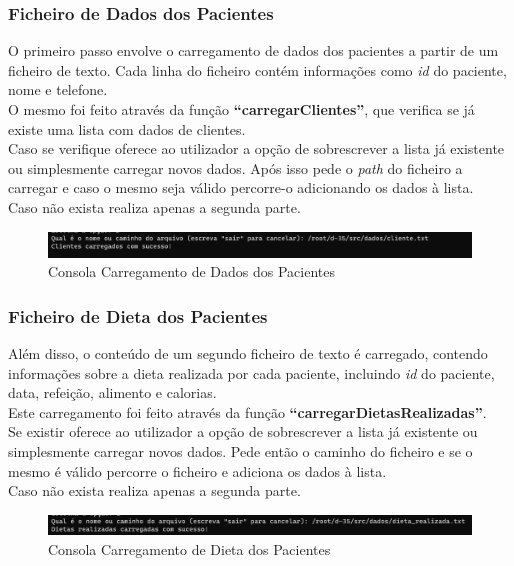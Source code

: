\documentclass{article}
\begin{document}
\newpage

\subsubsection{Ficheiro de Dados dos Pacientes}
O primeiro passo envolve o carregamento de dados dos pacientes a partir de um ficheiro de texto. Cada linha do ficheiro contém informações como \textit{id} do paciente, nome e telefone. \\O mesmo foi feito através da função \textbf{“carregarClientes”}, que verifica se já existe uma lista com dados de clientes. \\Caso se verifique oferece ao utilizador a opção de sobrescrever a lista já existente ou simplesmente carregar novos dados. Após isso pede o \emph{path} do ficheiro a carregar e caso o mesmo seja válido percorre-o adicionando os dados à lista. \\Caso não exista realiza apenas a segunda parte.\\

\begin{figure}[h]
    \centering
    \includegraphics[width=0.8\linewidth]{CarregarCliente.png}
    \caption{Consola Carregamento de Dados dos Pacientes}
    \label{fig:enter-label}
\end{figure}

\subsubsection{Ficheiro de Dieta dos Pacientes}
Além disso, o conteúdo de um segundo ficheiro de texto é carregado, contendo informações sobre a dieta realizada por cada paciente, incluindo \textit{id} do paciente, data, refeição, alimento e calorias. \\Este carregamento foi feito através da função \textbf{“carregarDietasRealizadas”}. \\ Se existir oferece ao utilizador a opção de sobrescrever a lista já existente ou simplesmente carregar novos dados. Pede então o caminho do ficheiro e se o mesmo é válido percorre o ficheiro e adiciona os dados à lista. \\Caso não exista realiza apenas a segunda parte.\\

\begin{figure}[h]
    \centering
    \includegraphics[width=0.8\linewidth]{CarregarDieta.png}
    \caption{Consola Carregamento de Dieta dos Pacientes}
    \label{fig:enter-label}
\end{figure}
\end{document}
